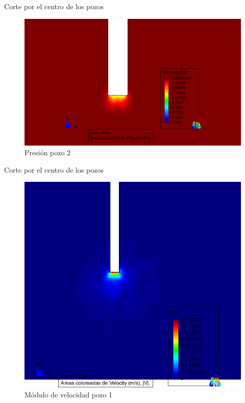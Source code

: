 \documentclass[spanish]{beamer}
\begin{document}
%
\begin{frame}{Corte por el centro de los pozos}
\begin{center}
\begin{figure}[htbp]
\centerline{\includegraphics[scale=0.3]{../img/100m/resul/100_XZ_presion_corte_centro_pozo2}}
\caption{Presión pozo 2}
\end{figure}
\end{center}
\end{frame}
%
\begin{frame}{Corte por el centro de los pozos}
\begin{center}
\begin{figure}[htbp]
\centerline{\includegraphics[scale=0.25]{../img/100m/resul/100_XZ_velocidad_corte_centro_pozo1}}
\caption{Módulo de velocidad pozo 1}
\end{figure}
\end{center}
\end{frame}
\end{document}
